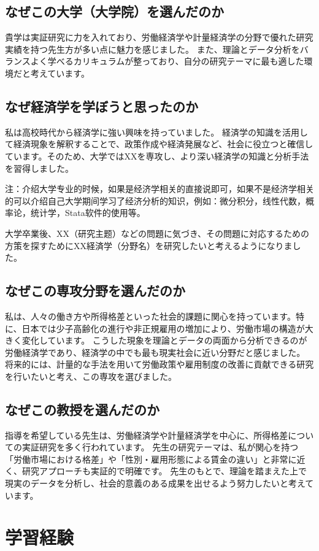 \documentclass[xelatex,a4paper,base=11pt,ja=standard,jafont=noto]{bxjsreport}
\begin{document}
\section{なぜこの大学（大学院）を選んだのか}
貴学は実証研究に力を入れており、労働経済学や計量経済学の分野で優れた研究実績を持つ先生方が多い点に魅力を感じました。
また、理論とデータ分析をバランスよく学べるカリキュラムが整っており、自分の研究テーマに最も適した環境だと考えています。
\section{なぜ経済学を学ぼうと思ったのか}
私は高校時代から経済学に強い興味を持っていました。
経済学の知識を活用して経済現象を解釈することで、政策作成や経済発展など、社会に役立つと確信しています。そのため、大学ではXXを専攻し、より深い経済学の知識と分析手法を習得しました。
\par 注：介绍大学专业的时候，如果是经济学相关的直接说即可，如果不是经济学相关的可以介绍自己大学期间学习了经济分析的知识，例如：微分积分，线性代数，概率论，统计学，Stata软件的使用等。
\par 大学卒業後、XX（研究主题）などの問題に気づき、その問題に対応するための方策を探すためにXX経済学（分野名）を研究したいと考えるようになりました。
\section{なぜこの専攻分野を選んだのか}
私は、人々の働き方や所得格差といった社会的課題に関心を持っています。特に、日本では少子高齢化の進行や非正規雇用の増加により、労働市場の構造が大きく変化しています。
こうした現象を理論とデータの両面から分析できるのが労働経済学であり、経済学の中でも最も現実社会に近い分野だと感じました。
将来的には、計量的な手法を用いて労働政策や雇用制度の改善に貢献できる研究を行いたいと考え、この専攻を選びました。
\section{なぜこの教授を選んだのか}
指導を希望している先生は、労働経済学や計量経済学を中心に、所得格差についての実証研究を多く行われています。
先生の研究テーマは、私が関心を持つ「労働市場における格差」や「性別・雇用形態による賃金の違い」と非常に近く、研究アプローチも実証的で明確です。
先生のもとで、理論を踏まえた上で現実のデータを分析し、社会的意義のある成果を出せるよう努力したいと考えています。

\chapter{学習経験}
\end{document}
